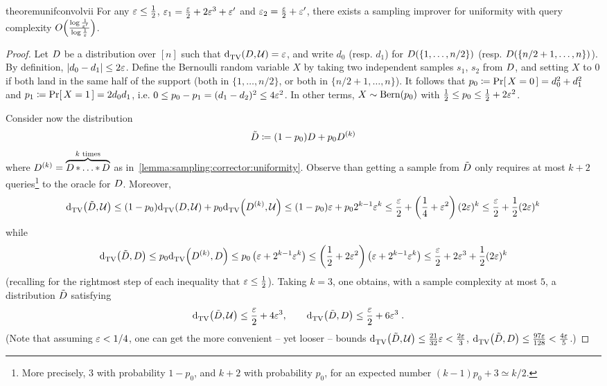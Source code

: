 \begin{restatable}{theorem}{unifconvolvii}\label{lemma:sampling:corrector:uniformity:hybrid}
  For any $\varepsilon\leq \frac{1}{2}$, $\varepsilon_1=\frac{\varepsilon}{2}+2\varepsilon^3+\varepsilon^\prime$ and $\varepsilon_2=\frac{\varepsilon}{2}+\varepsilon^\prime$, there exists a sampling improver for uniformity with query complexity $\bigO{\frac{\log\frac{1}{\eps^\prime}}{\log\frac{1}{\eps}}}$.
\end{restatable}
\begin{proof}
Let $D$ be a distribution over $[n]$ such that ${\operatorname{d}_{\textrm{TV}}^{}\!\left({D, \mathcal{U}}\right)} = \varepsilon$, and write $d_0$ (resp. $d_1$) for $D(\{1,\dots,n/2\})$ (resp. $D(\{n/2+1,\dots,n\})$). By definition, $\left\lvert d_0-d_1 \right\rvert\leq 2\varepsilon$.
Define the Bernoulli random variable $X$ by taking two independent samples $s_1$, $s_2$ from $D$, and setting $X$ to $0$ if both land in the same half of the support (both in $\{1,\dots,n/2\}$, or both in $\{n/2+1,\dots,n\}$). It follows that 
$p_0\coloneqq \Pr\!\left[\, X=0\, \right] = d_0^2 + d_1^2$ and $p_1\coloneqq \Pr\!\left[\, X=1\, \right] = 2d_0d_1$, i.e. $0\leq p_0-p_1 = (d_1-d_2)^2 \leq 4\varepsilon^2$. In other terms, $X\sim \operatorname{Bern}\!\left( p_0 \right)$ with $\frac{1}{2}\leq p_0\leq \frac{1}{2}+2\varepsilon^2$.\medskip

\noindent Consider now the distribution
\[
    \tilde{\D} \eqdef (1-p_0)D + p_0 D^{(k)} \vspace{-\baselineskip}
\]
where $D^{(k)}=\overbrace{D\operatorname{\ast}\dots\operatorname{\ast} D}^{k\text{ times}}$ as in~\cref{lemma:sampling:corrector:uniformity}. Observe than getting a sample from $\tilde{D}$ only requires at most $k+2$ queries\footnote{More precisely, $3$ with probability $1-p_0$, and $k+2$ with probability $p_0$, for an expected number $(k-1)p_0+3\simeq k/2$.} to the oracle for $D$. Moreover,
\[
  {\operatorname{d}_{\textrm{TV}}^{}\!\left({ \tilde{D} ,  \mathcal{U} }\right)} \leq (1-p_0){\operatorname{d}_{\textrm{TV}}^{}\!\left({D, \mathcal{U}}\right)} + p_0 {\operatorname{d}_{\textrm{TV}}^{}\!\left({ D^{(k)} , \mathcal{U}}\right)} \leq (1-p_0)\varepsilon + p_0 2^{k-1}\varepsilon^k
  \leq \frac{\varepsilon}{2} + \left(\frac{1}{4}+\varepsilon^2\right)(2\varepsilon)^k \leq \frac{\varepsilon}{2} + \frac{1}{2}(2\varepsilon)^k
\]
while
\[
  {\operatorname{d}_{\textrm{TV}}^{}\!\left({ \tilde{D} , D}\right)} \leq p_0{\operatorname{d}_{\textrm{TV}}^{}\!\left({ D^{(k)} , D}\right)}  \leq p_0\left( \varepsilon+2^{k-1}\varepsilon^k \right)\leq \left(\frac{1}{2}+2\varepsilon^2\right)\left( \varepsilon+2^{k-1}\varepsilon^k \right)
  \leq \frac{\varepsilon}{2} + 2\varepsilon^3 + \frac{1}{2}(2\varepsilon)^k
\]
(recalling for the rightmost step of each inequality that $\varepsilon \leq\frac{1}{2}$). Taking $k=3$, one obtains, with a sample complexity at most $5$, a distribution $\tilde{D}$ satisfying
\begin{align*}
  {\operatorname{d}_{\textrm{TV}}^{}\!\left({ \tilde{\ensuremath{D}} ,  \ensuremath{\mathcal{U}}}\right)} &\leq \frac{\varepsilon}{2} + 4\varepsilon^3, \qquad
  {\operatorname{d}_{\textrm{TV}}^{}\!\left({ \tilde{\ensuremath{D}} , \ensuremath{D}}\right)} \leq \frac{\varepsilon}{2}+6\varepsilon^3 \;.
\end{align*}
(Note that assuming $\varepsilon < 1/4$, one can get the more convenient -- yet looser -- bounds ${\operatorname{d}_{\textrm{TV}}^{}\!\left({ \tilde{D} ,  \mathcal{U} }\right)} \leq \frac{21}{32}\varepsilon < \frac{2\varepsilon}{3}$, ${\operatorname{d}_{\textrm{TV}}^{}\!\left({ \tilde{D} , D}\right)} \leq \frac{97\varepsilon}{128} < \frac{4\varepsilon}{5}$.)
\end{proof}

